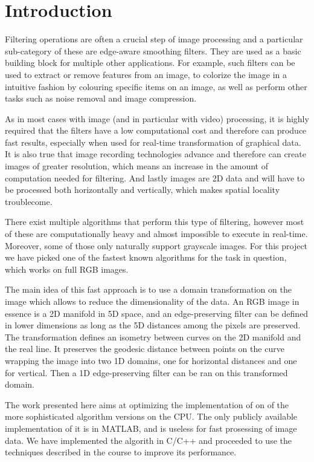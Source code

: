 \section{Introduction}\label{sec:intro}

Filtering operations are often a crucial step of image processing and a particular sub-category of these are edge-aware smoothing filters. 
They are used as a basic building block for multiple other applications.
For example, such filters can be used to extract or remove features from an
image, to colorize the image in a intuitive fashion by colouring specific
items on an image, as well as perform other tasks such as noise removal and
image compression.

As in most cases with image (and in particular with video) processing, it is
highly required that the filters have a low computational cost and therefore
can produce fast results, especially when used for real-time transformation of
graphical data. It is also true that image recording technologies advance and 
therefore can create images of greater resolution, which means an increase in
the amount of computation needed for filtering. And lastly images are 2D data
and will have to be processed both horizontally and vertically, which makes
spatial locality troublecome.

There exist multiple algorithms that perform this type of filtering, however
most of these are computationally heavy and almost impossible to execute in
real-time. Moreover, some of those only naturally support grayscale images. 
For this project we have picked one of the fastest known algorithms for the
task in question, which works on full RGB images.

The main idea of this fast approach is to use a domain transformation on the
image which allows to reduce the dimensionality of the data. An RGB image in
essence is a 2D manifold in 5D space, and an edge-preserving filter can be
defined in lower dimensions as long as the 5D distances among the pixels are
preserved. The transformation defines an isometry between curves on the 2D
manifold and the real line. It preserves the geodesic distance between points
on the curve wrapping the image into two 1D domains, one for horizontal 
distances and one for vertical. Then a 1D edge-preserving filter can be ran on
this transformed domain.

The work presented here aims at optimizing the implementation of on of the 
more sophisticated algorithm versions on the CPU. The only publicly available
implementation of it is in MATLAB, and is useless for fast prosessing of image
data. We have implemented the algorith in C/C++ and proceeded to use the
techniques described in the course to improve its performance.

